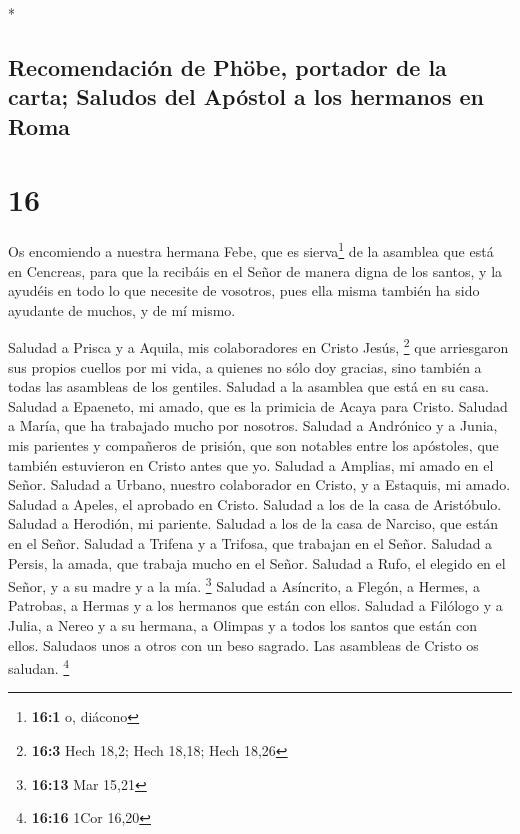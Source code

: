 \begin{paracol}{2}
\switchcolumn[0]*

\hypertarget{recomendaciuxf3n-de-phuxf6be-portador-de-la-carta-saludos-del-apuxf3stol-a-los-hermanos-en-roma}{%
\subsection{Recomendación de Phöbe, portador de la carta; Saludos del
Apóstol a los hermanos en
Roma}\label{recomendaciuxf3n-de-phuxf6be-portador-de-la-carta-saludos-del-apuxf3stol-a-los-hermanos-en-roma}}

\hypertarget{section-30}{%
\section{16}\label{section-30}}

 Os encomiendo a nuestra hermana Febe, que es
sierva\footnote{\textbf{16:1} o, diácono} de la asamblea que está en
Cencreas,  para que la recibáis en el Señor de manera
digna de los santos, y la ayudéis en todo lo que necesite de vosotros,
pues ella misma también ha sido ayudante de muchos, y de mí mismo.

 Saludad a Prisca y a Aquila, mis colaboradores en Cristo
Jesús, \footnote{\textbf{16:3} Hech 18,2; Hech 18,18; Hech 18,26}
 que arriesgaron sus propios cuellos por mi vida, a
quienes no sólo doy gracias, sino también a todas las asambleas de los
gentiles.  Saludad a la asamblea que está en su casa.
Saludad a Epaeneto, mi amado, que es la primicia de Acaya para Cristo.
 Saludad a María, que ha trabajado mucho por nosotros.
 Saludad a Andrónico y a Junia, mis parientes y compañeros
de prisión, que son notables entre los apóstoles, que también estuvieron
en Cristo antes que yo.  Saludad a Amplias, mi amado en el
Señor.  Saludad a Urbano, nuestro colaborador en Cristo, y
a Estaquis, mi amado.  Saludad a Apeles, el aprobado en
Cristo. Saludad a los de la casa de Aristóbulo.  Saludad
a Herodión, mi pariente. Saludad a los de la casa de Narciso, que están
en el Señor.  Saludad a Trifena y a Trifosa, que trabajan
en el Señor. Saludad a Persis, la amada, que trabaja mucho en el Señor.
 Saludad a Rufo, el elegido en el Señor, y a su madre y a
la mía. \footnote{\textbf{16:13} Mar 15,21}  Saludad a
Asíncrito, a Flegón, a Hermes, a Patrobas, a Hermas y a los hermanos que
están con ellos.  Saludad a Filólogo y a Julia, a Nereo y
a su hermana, a Olimpas y a todos los santos que están con ellos.
 Saludaos unos a otros con un beso sagrado. Las asambleas
de Cristo os saludan. \footnote{\textbf{16:16} 1Cor 16,20}


\end{paracol}
